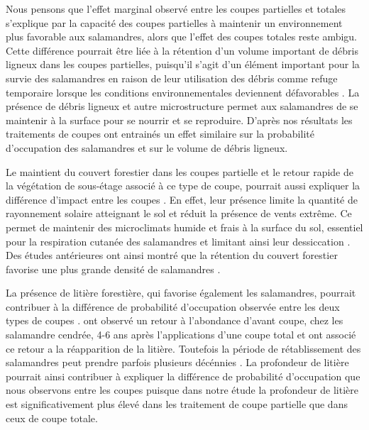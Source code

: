 Nous pensons que l'effet marginal observé entre les coupes partielles et totales s'explique par la capacité des coupes partielles à maintenir un environnement plus favorable aux salamandres, 
alors que l'effet des coupes totales reste ambigu. 
Cette différence pourrait être liée à la rétention d'un volume important de débris ligneux dans les coupes partielles, 
puisqu'il s'agit d'un élément important pour la survie des salamandres en raison de leur utilisation des débris comme refuge temporaire lorsque les conditions environnementales deviennent défavorables \citep{Nolet2018Comparingeffects,Peterman2014Spatialvariation,Achat2015Quantifyingconsequences,Peele2017Effectswoody}.
La présence de débris ligneux et autre microstructure permet aux salamandres de se maintenir à la surface pour se nourrir et se reproduire. 
D'après nos résultats les traitements de coupes ont entrainés un effet similaire sur la probabilité d'occupation des salamandres et sur le volume de débris ligneux.

Le maintient du couvert forestier dans les coupes partielle et le retour rapide de la végétation de sous-étage associé à ce type de coupe, pourrait aussi expliquer la différence d'impact entre les coupes \citep{Raybuck2015silviculturalpractices}.
En effet, leur présence limite la quantité de rayonnement solaire atteignant le sol et réduit la présence de vents extrême. 
Ce permet de maintenir des microclimats humide et frais à la surface du sol, essentiel pour la respiration cutanée des salamandres et limitant ainsi leur dessiccation \citep{Homyack2011Energeticssurfaceactive}. 
Des études antérieures ont ainsi montré que la rétention du couvert forestier favorise une plus grande densité de salamandres \citep{Hocking2013Effectsexperimental,Harper2015Impactforestry,Mahoney2016Woodlandsalamander}. 

La présence de litière forestière, qui favorise également les salamandres, pourrait contribuer à la différence de probabilité d'occupation observée entre les deux types de coupes \citep{Tilghman2012Metaanalysiseffects}.
\cite{Ash1997DisappearanceReturn} ont observé un retour à l'abondance d'avant coupe, chez les salamandre cendrée, 4-6 ans après l'applications d'une coupe total et ont associé ce retour a la réapparition de la litière. 
Toutefois la période de rétablissement des salamandres peut prendre parfois plusieurs décénnies \citep{Homyack2013Effectsrepeatedstand,Ochs2022Responseterrestrial}. 
La profondeur de litière pourrait ainsi contribuer à expliquer la différence de probabilité d'occupation que nous observons entre les coupes puisque dans notre étude la profondeur de litière est significativement plus élevé dans les traitement de coupe partielle que dans ceux de coupe totale.

